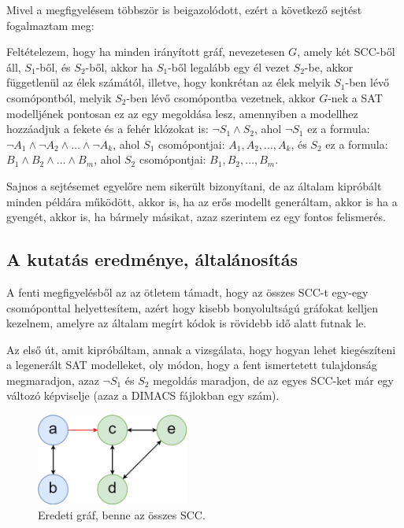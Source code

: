 \documentclass[
]{thesis-ekf}
\theoremstyle{definition}
\theoremstyle{remark}
\begin{document}
	Mivel a megfigyelésem többször is beigazolódott, ezért a következő sejtést fogalmaztam meg:
	
	Feltételezem, hogy ha minden irányított gráf, nevezetesen $G$, amely két \textsc{SCC}-ből áll, $ S_1 $-ből, és $ S_2 $-ből, akkor ha $ S_1 $-ből legalább egy él vezet $ S_2 $-be, akkor függetlenül az élek számától, illetve, hogy konkrétan az élek melyik $ S_1 $-ben lévő csomópontból, melyik $ S_2 $-ben lévő csomópontba vezetnek, akkor $G$-nek a \textsc{SAT} modelljének pontosan ez az egy megoldása lesz, amennyiben a modellhez hozzáadjuk a fekete és a fehér klózokat is: $ \neg S_1\wedge S_2 $, ahol $ \neg S_1 $ ez a formula: $\neg A_1 \wedge \neg A_2\wedge\dots\wedge\neg A_k$, ahol $ S_1 $ csomópontjai: $ A_1,A_2,\dots,A_k $, és $ S_2 $ ez a formula: $ B_1\wedge B_2\wedge\dots\wedge B_m $, ahol $ S_2 $ csomópontjai: $ B_1,B_2,\dots,B_m $.
	
	Sajnos a sejtésemet egyelőre nem sikerült bizonyítani, de az általam kipróbált minden példára működött, akkor is, ha az erős modellt generáltam, akkor is ha a gyengét, akkor is, ha bármely másikat, azaz szerintem ez egy fontos felismerés.
	
		\subsection{A kutatás eredménye, általánosítás}

	A fenti megfigyelésből az az ötletem támadt, hogy az összes \textsc{SCC}-t egy-egy csomóponttal helyettesítem, azért hogy kisebb bonyolultságú gráfokat kelljen kezelnem, amelyre az általam megírt kódok is rövidebb idő alatt futnak le.

	Az első út, amit kipróbáltam, annak a vizsgálata, hogy hogyan lehet kiegészíteni a legenerált \textsc{SAT} modelleket, oly módon, hogy a fent ismertetett tulajdonság megmaradjon, azaz $\neg S_1$ és $ S_2 $ megoldás maradjon, de az egyes \textsc{SCC}-ket már egy változó képviselje (azaz a \textsc{DIMACS} fájlokban egy szám).
	
	\begin{figure}[!ht]
		\centering
		\includegraphics[width=5cm]{images/sajat_pelda_5node_9edge}
		\caption{Eredeti gráf, benne az összes \textsc{SCC}.}
		\label{abra-sajatpelda-eredeti-5-9graf}
	\end{figure}
\end{document}

